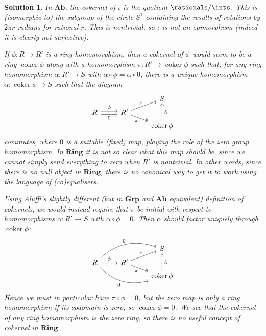 \documentclass[article, a4paper, 11pt, oneside]{memoir}
\numberwithin{equation}{chapter}
\DeclareMathOperator{\coker}{coker}
\newcommand{\ncat}[1]{\mathbf{#1}} %
\newcommand{\catGrp}{\ncat{Grp}} %
\newcommand{\catAb}{\ncat{Ab}} %
\newcommand{\catRing}{\ncat{Ring}} %
\theoremstyle{nonumberplain}
\newtheorem{solution}{Solution}
\begin{document}
\begin{solution}
    In $\catAb$, the cokernel of $\iota$ is the quotient $\rationals/\ints$. This is (isomorphic to) the subgroup of the circle $S^1$ containing the results of rotations by $2\pi r$ radians for rational $r$. This is nontrivial, so $\iota$ is not an epimorphism (indeed it is clearly not surjective).

    If $\phi \colon R \to R'$ is a ring homomorphism, then a cokernel of $\phi$ would seem to be a ring $\coker\phi$ along with a homomorphism $\pi \colon R' \to \coker\phi$ such that, for any ring homomorphism $\alpha \colon R' \to S$ with $\alpha \circ \phi = \alpha \circ 0$, there is a unique homomorphism $\tilde\alpha \colon \coker\phi \to S$ such that the diagram
    \begin{equation*}
        \begin{tikzcd}[row sep=tiny]
            && S \\
            R
                \ar[r, "\phi", shift left]
                \ar[r, "0", shift right, swap]
            & R'
                \ar[ur, "\alpha"]
                \ar[dr, "\pi", swap, twoheadrightarrow] \\
            && \coker\phi
                \ar[uu, "\tilde\alpha", swap, dashed]
        \end{tikzcd}
    \end{equation*}
    commutes, where $0$ is a suitable (fixed) map, playing the role of the zero group homomorphism. In $\catRing$ it is not so clear what this map should be, since we cannot simply send everything to zero when $R'$ is nontrivial. In other words, since there is no null object in $\catRing$, there is no canonical way to get it to work using the language of (co)equalisers.

    Using Aluffi's slightly different (but in $\catGrp$ and $\catAb$ equivalent) definition of cokernels, we would instead require that $\pi$ be initial with respect to homomorphisms $\alpha \colon R' \to S$ with $\alpha \circ \phi = 0$. Then $\alpha$ should factor uniquely through $\coker\phi$:
    \begin{equation*}
        \begin{tikzcd}[row sep=tiny]
            && S \\
            R
                \ar[r, "\phi"]
                \ar[urr, "0", bend left]
                \ar[drr, "0", bend right, swap]
            & R'
                \ar[ur, "\alpha"]
                \ar[dr, "\pi", swap, twoheadrightarrow] \\
            && \coker\phi
                \ar[uu, "\tilde\alpha", swap, dashed]
        \end{tikzcd}
    \end{equation*}
    Hence we must in particular have $\pi \circ \phi = 0$, but the zero map is only a ring homomorphism if its codomain is zero, so $\coker\phi = 0$. We see that the cokernel of \emph{any} ring homomorphism is the zero ring, so there is no useful concept of cokernel in $\catRing$.
\end{solution}
\end{document}
